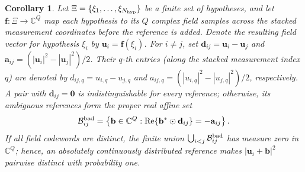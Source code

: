 \documentclass[journal]{IEEEtran}
\newtheorem{corollary}{Corollary}
\begin{document}
\begin{corollary}
\label{cor:generic_reference_finite_hypotheses}
Let $\Xi=\{\xi_1,\ldots,\xi_{N_{\rm hyp}}\}$ be a finite set of hypotheses, and
let $\mathbf f:\Xi\to\mathbb C^Q$ map each hypothesis to its $Q$
complex field samples across the stacked measurement coordinates before the reference is added. Denote the
resulting field vector for hypothesis $\xi_i$ by
$\mathbf u_i=\mathbf f(\xi_i)$. For $i\ne j$, set
$\mathbf d_{ij}=\mathbf u_i-\mathbf u_j$ and
$\mathbf a_{ij}=(|\mathbf u_i|^2-|\mathbf u_j|^2)/2$. Their $q$-th entries (along the stacked measurement index $q$) are denoted by
$d_{ij,q}=u_{i,q}-u_{j,q}$ and
$a_{ij,q}=(|u_{i,q}|^2-|u_{j,q}|^2)/2$, respectively. A pair with
$\mathbf d_{ij}=\mathbf0$ is indistinguishable for every reference; otherwise,
its ambiguous references form the proper real affine set
\begin{equation}
\mathcal B_{ij}^{\rm bad}
=
\left\{
\mathbf b\in\mathbb C^Q:
\operatorname{Re}\{\mathbf b^*\odot\mathbf d_{ij}\}
=-\mathbf a_{ij}
\right\}.
\label{eq:bad_reference_affine_set}
\end{equation}
If all field codewords are distinct, the finite union
$\bigcup_{i<j}\mathcal B_{ij}^{\rm bad}$ has measure zero in $\mathbb C^Q$;
hence, an absolutely continuously distributed reference makes
$|\mathbf u_i+\mathbf b|^2$ pairwise distinct with probability one.
\end{corollary}
\end{document}
